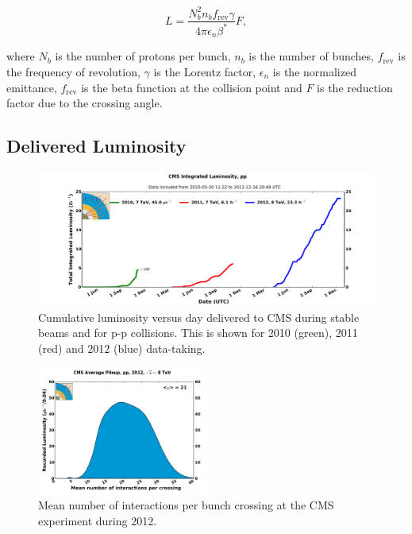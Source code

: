 \begin{equation}
L=\frac{N_{b}^{2}n_{b}f_{\text{rev}}\gamma}{4\pi\epsilon_{n}\beta^{*}}F,
\end{equation}

where $N_{b}$ is the number of protons per bunch, $n_{b}$ is the number of bunches, $f_{\text{rev}}$ is the frequency of revolution, $\gamma$ is the Lorentz factor, $\epsilon_{n}$ is the normalized emittance, $f_{\text{rev}}$ is the beta function at the collision point and $F$ is the reduction factor due to the crossing angle.


\subsection{Delivered Luminosity}

\begin{figure}[!htb]
  \centering
  \includegraphics[width=1.00\textwidth]{Chapter02/CMS/Images/CMS_IntegratedLumi_pp_2010-2012}
  \caption{Cumulative luminosity versus day delivered to CMS during stable beams and for p-p collisions. This is shown for 2010 (green), 2011 (red) and 2012 (blue) data-taking.}
  \label{FIGURE:ExperimentalApparatus_CMS_IntegratedLumi_pp_2010-2012}
\end{figure}

\begin{figure}[!htb]
  \centering
  \includegraphics[width=0.50\textwidth]{Chapter02/CMS/Images/CMS_PileIp_pp_2012}
  \caption{Mean number of interactions per bunch crossing at the CMS experiment during 2012.}
  \label{FIGURE:ExperimentalApparatus_CMS_PileIp_pp_2012}
\end{figure}

